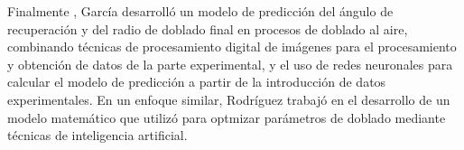 
Finalmente , García \cite{garcia2005} desarrolló un modelo de predicción del ángulo de recuperación y del 
radio de doblado final en procesos de doblado al aire, combinando técnicas de procesamiento digital 
de imágenes para el procesamiento y obtención de datos de la parte experimental, y el uso de redes neuronales 
para calcular el modelo de predicción a partir de la introducción de datos experimentales. En un enfoque 
similar, Rodríguez \cite{rodriguez2014} trabajó en el desarrollo de un modelo matemático que utilizó para 
optmizar parámetros de doblado mediante técnicas de inteligencia artificial.
